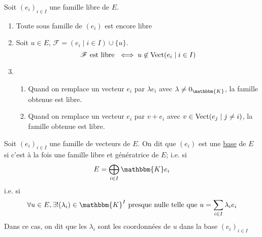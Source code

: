 \begin{prop}
	Soit $(e_i)_{i\in I}$ une famille libre de $E$. 
	\begin{enumerate}
		\item Toute sous famille de $(e_i)$ est encore libre
		\item Soit $u \in E$, $\mathcal{F} = (e_i \mid i \in I) \cup \{u\}$.\\
			\[
				\mathcal{F} \text{ est libre } \iff u \not\in \operatorname{Vect}(e_i  \mid i \in I)
			\]
		\item
			\begin{enumerate}
				\item Quand on remplace un vecteur $e_i$ par $\lambda e_i$ avec $\lambda \neq 0_\mathbbm{K}$, la famille obtenue est libre.
				\item Quand on remplace un vecteur $e_i$ par $v + e_i$ avec $v \in \operatorname{Vect}(e_j  \mid j \neq i)$, la famille obtenue est libre.
			\end{enumerate}
	\end{enumerate}
\end{prop}

\begin{defn}
	Soit $(e_i)_{i\in I}$ une famille de vecteurs de $E$. On dit que $(e_i)$ est une \underline{base} de $E$ si c'est à la fois une famille libre et génératrice de $E$; i.e. si \[
		E = \bigoplus_{i \in I} \mathbbm{K}e_i
	\] i.e. si \[
		\forall u \in E, \exists ! (\lambda_i) \in \mathbbm{K}^I \text{ presque nulle telle que } u = \sum_{i \in I} \lambda_i e_i
	\] Dans ce cas, on dit que les $\lambda_i$ sont les coordonnées de $u$ dans la base $(e_i)_{i\in I}$
\end{defn}

